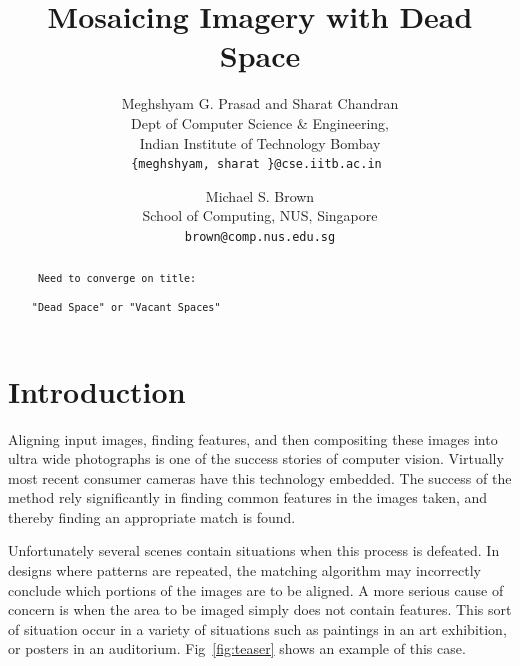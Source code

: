 \documentclass[10pt,twocolumn,letterpaper]{article}
\begin{document}
\title{Mosaicing Imagery with Dead Space}

\author{Meghshyam G. Prasad and Sharat Chandran\\
Dept of Computer Science \& Engineering, \\
Indian Institute of Technology Bombay\\
{\tt\small \{meghshyam, sharat \}@cse.iitb.ac.in }
\and
Michael S. Brown\\
School of Computing, NUS, Singapore\\
{\tt\small brown@comp.nus.edu.sg}
}

\maketitle


\begin{abstract}

{\color{red} 
\noindent \verb+ Need to converge on title: +

\noindent \verb+"Dead Space" or "Vacant Spaces"+ 

}

   
\end{abstract}

\section{Introduction}

Aligning input images, finding features, and then compositing these
images into ultra wide photographs is one of the success stories of
computer vision.  Virtually most recent consumer cameras have this
technology embedded.  The success of the method rely significantly in
finding common features in the images taken, and thereby finding an
appropriate match is found.

Unfortunately several scenes contain situations when this process is
defeated.  In designs where patterns are repeated, the matching
algorithm may incorrectly conclude which portions of the images are to
be aligned. 
A more serious cause of concern is when the area to be imaged simply
does not contain features.  This sort of situation occur in a variety
of situations such as paintings in an art exhibition, or posters in an
auditorium.  Fig~\ref{fig:teaser} shows an example of this
case. 
\end{document}
